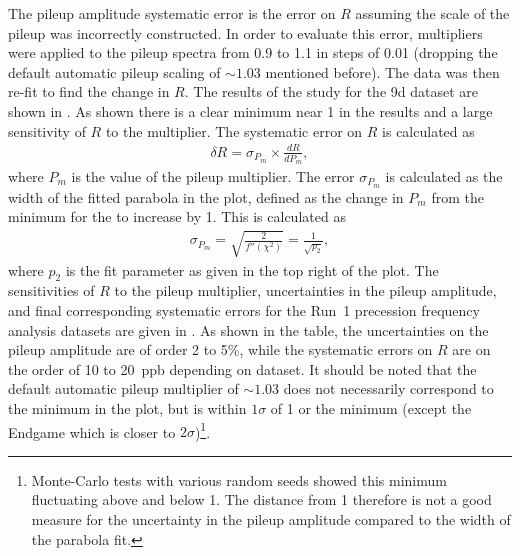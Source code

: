 The pileup amplitude systematic error is the error on $R$ assuming the scale of the pileup was incorrectly constructed. In order to evaluate this error, multipliers were applied to the pileup spectra from 0.9 to 1.1 in steps of 0.01 (dropping the default automatic pileup scaling of $\sim1.03$ mentioned before). The data was then re-fit to find the change in $R$. The results of the study for the 9d dataset are shown in . As shown there is a clear minimum near 1 in the \chisq results and a large sensitivity of $R$ to the multiplier. The systematic error on $R$ is calculated as 
    \begin{align}
        \delta R = \sigma_{P_{m}} \times \frac{dR}{dP_{m}},
    \end{align}
where $P_{m}$ is the value of the pileup multiplier. The error $\sigma_{P_{m}}$ is calculated as the width of the fitted parabola in the \chisq plot, defined as the change in $P_{m}$ from the minimum for the \chisq to increase by 1. This is calculated as 
    \begin{align}
        \sigma_{P_{m}} = \sqrt{\frac{2}{f''(\chi^{2})}} = \frac{1}{\sqrt{p_{2}}},
    \end{align}
where $p_{2}$ is the fit parameter as given in the top right of the \chisq plot. The sensitivities of $R$ to the pileup multiplier, uncertainties in the pileup amplitude, and final corresponding systematic errors for the Run~1 precession frequency analysis datasets are given in . As shown in the table, the uncertainties on the pileup amplitude are of order 2 to 5\%, while the systematic errors on $R$ are on the order of \SI{10}{} to \SI{20}{ppb} depending on dataset.  It should be noted that the default automatic pileup multiplier of $\sim1.03$ does not necessarily correspond to the minimum in the \chisq plot, but is within $1\sigma$ of 1 or the minimum (except the Endgame which is closer to $2\sigma$)\footnote{Monte-Carlo tests with various random seeds showed this minimum fluctuating above and below 1. The distance from 1 therefore is not a good measure for the uncertainty in the pileup amplitude compared to the width of the \chisq parabola fit.}.


